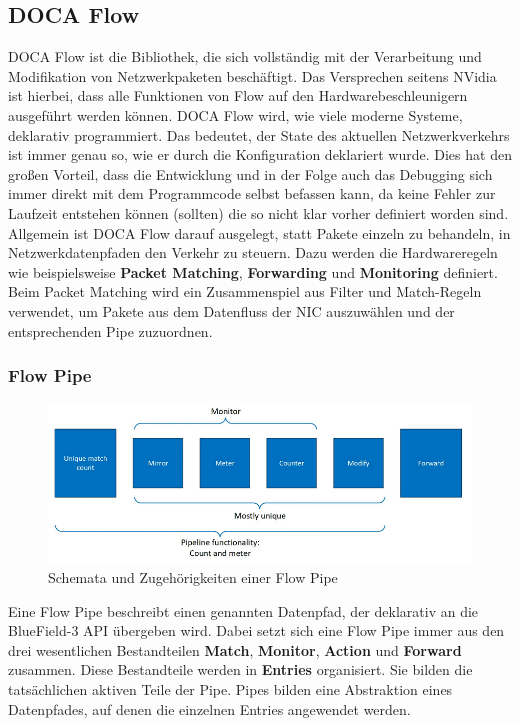 \subsection{DOCA Flow}
DOCA Flow ist die Bibliothek, die sich vollständig mit der Verarbeitung und Modifikation von Netzwerkpaketen beschäftigt. Das Versprechen seitens NVidia ist hierbei, dass alle Funktionen von Flow auf den Hardwarebeschleunigern ausgeführt werden können. DOCA Flow wird, wie viele moderne Systeme, deklarativ programmiert. Das bedeutet, der State des aktuellen Netzwerkverkehrs ist immer genau so, wie er durch die Konfiguration deklariert wurde. Dies hat den großen Vorteil, dass die Entwicklung und in der Folge auch das Debugging sich immer direkt mit dem Programmcode selbst befassen kann, da keine Fehler zur Laufzeit entstehen können (sollten) die so nicht klar vorher definiert worden sind.
Allgemein ist DOCA Flow darauf ausgelegt, statt Pakete einzeln zu behandeln, in Netzwerkdatenpfaden den Verkehr zu steuern. Dazu werden die Hardwareregeln wie beispielsweise \textbf{Packet Matching}, \textbf{Forwarding} und \textbf{Monitoring} definiert. Beim Packet Matching wird ein Zusammenspiel aus Filter und Match-Regeln verwendet, um Pakete aus dem Datenfluss der NIC auszuwählen und der entsprechenden Pipe zuzuordnen.
\subsubsection{Flow Pipe}
\begin{figure}
    \centering
    \includegraphics[width=1\linewidth]{images/pipe.png}
    \caption{Schemata und Zugehörigkeiten einer Flow Pipe}
    \label{fig:enter-label}
\end{figure}
Eine Flow Pipe beschreibt einen genannten Datenpfad, der deklarativ an die BlueField-3 API übergeben wird. Dabei setzt sich eine Flow Pipe immer aus den drei wesentlichen Bestandteilen \textbf{Match}, \textbf{Monitor}, \textbf{Action} und \textbf{Forward} zusammen. Diese Bestandteile werden in \textbf{Entries} organisiert. Sie bilden die tatsächlichen aktiven Teile der Pipe. Pipes bilden eine Abstraktion eines Datenpfades, auf denen die einzelnen Entries angewendet werden.

